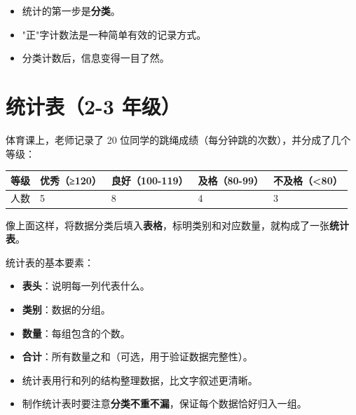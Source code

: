 \begin{keytakeaway}


\begin{itemize}
  \item 统计的第一步是\textbf{分类}。
  \item "正"字计数法是一种简单有效的记录方式。
  \item 分类计数后，信息变得一目了然。
\end{itemize}


\end{keytakeaway}



\section*{统计表（2-3 年级）}


\begin{explore}


体育课上，老师记录了 20 位同学的跳绳成绩（每分钟跳的次数），并分成了几个等级：

\begin{center}
\begin{tabular}{lllll}
\toprule
等级 & 优秀（≥120） & 良好（100-119） & 及格（80-99） & 不及格（<80） \\
\midrule
人数 & 5 & 8 & 4 & 3 \\
\bottomrule
\end{tabular}
\end{center}


\end{explore}

\begin{understand}


像上面这样，将数据分类后填入\textbf{表格}，标明类别和对应数量，就构成了一张\textbf{统计表}。

统计表的基本要素：
\begin{itemize}
  \item \textbf{表头}：说明每一列代表什么。
  \item \textbf{类别}：数据的分组。
  \item \textbf{数量}：每组包含的个数。
  \item \textbf{合计}：所有数量之和（可选，用于验证数据完整性）。
\end{itemize}


\end{understand}

\begin{keytakeaway}


\begin{itemize}
  \item 统计表用行和列的结构整理数据，比文字叙述更清晰。
  \item 制作统计表时要注意\textbf{分类不重不漏}，保证每个数据恰好归入一组。
\end{itemize}


\end{keytakeaway}



